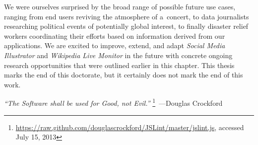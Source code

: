We were ourselves surprised by the broad range
of possible future use cases, ranging from end users
reviving the atmosphere of a~concert,
to data journalists researching political events
of potentially global interest,
to finally disaster relief workers coordinating
their efforts based on information derived from our applications.
We are excited to improve, extend, and adapt
\emph{Social Media Illustrator} and \emph{Wikipedia Live Monitor}
in the future with concrete ongoing research opportunities
that were outlined earlier in this chapter.
This thesis marks the end of this doctorate,
but it certainly does not mark the end of this work.

\begin{flushright}
\textit{``The Software shall be used for Good, not Evil.''}%
\footnote{\url{https://raw.github.com/douglascrockford/JSLint/master/jslint.js},
accessed July 15, 2013}~---Douglas Crockford
\end{flushright}

\clearpage
\printbibliography[heading=subbibliography]